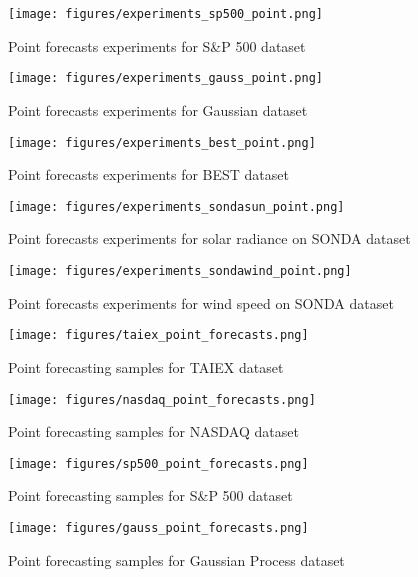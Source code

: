 \begin{figure}
\texttt{[image: figures/experiments\_sp500\_point.png]}
\caption{Point forecasts experiments for S\&P 500 dataset}
\label{fig:experiments_sp500_point}
\end{figure}

\begin{figure}
\texttt{[image: figures/experiments\_gauss\_point.png]}
\caption{Point forecasts experiments for Gaussian dataset}
\label{fig:experiments_gauss_point}
\end{figure}

\begin{figure}
\texttt{[image: figures/experiments\_best\_point.png]}
\caption{Point forecasts experiments for BEST dataset}
\label{fig:experiments_best_point}
\end{figure}

\begin{figure}
\texttt{[image: figures/experiments\_sondasun\_point.png]}
\caption{Point forecasts experiments for solar radiance on SONDA dataset}
\label{fig:experiments_sondasun_point}
\end{figure}

\begin{figure}
\texttt{[image: figures/experiments\_sondawind\_point.png]}
\caption{Point forecasts experiments for wind speed on SONDA dataset}
\label{fig:experiments_sondawind_point}
\end{figure}

\begin{figure}
\texttt{[image: figures/taiex\_point\_forecasts.png]}
\caption{Point forecasting samples for TAIEX dataset}
\label{fig:taiex_point_forecasts}
\end{figure}

\begin{figure}
\texttt{[image: figures/nasdaq\_point\_forecasts.png]}
\caption{Point forecasting samples for NASDAQ dataset}
\label{fig:nasdaq_point_forecasts}
\end{figure}

\begin{figure}
\texttt{[image: figures/sp500\_point\_forecasts.png]}
\caption{Point forecasting samples for S\&P 500 dataset}
\label{fig:sp500_point_forecasts}
\end{figure}

\begin{figure}
\texttt{[image: figures/gauss\_point\_forecasts.png]}
\caption{Point forecasting samples for Gaussian Process dataset}
\label{fig:gauss_point_forecasts}
\end{figure}

